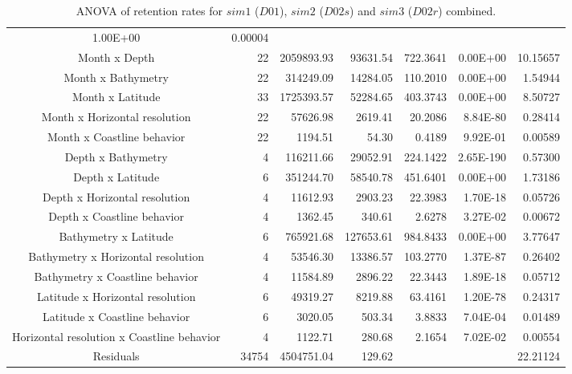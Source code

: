 \begin{table}[H]
\begin{adjustbox}{width=0.9\textwidth}
\begin{tabular}{c|r|r|r|r|r|r}
1.00E+00					& 
0.00004						\\
Month x Depth	& 
22				& 
2059893.93		& 
93631.54		& 
722.3641		& 
0.00E+00		& 
10.15657		\\
Month x Bathymetry	& 
22					& 
314249.09			& 
14284.05			& 
110.2010			& 
0.00E+00			& 
1.54944				\\
Month x Latitude		& 
33						& 
1725393.57				& 
52284.65				& 
403.3743				& 
0.00E+00				& 
8.50727					\\
Month x Horizontal resolution	& 
22								& 
57626.98						& 
2619.41							& 
20.2086							& 
8.84E-80						& 
0.28414							\\
Month x Coastline behavior	& 
22							& 
1194.51						& 
54.30						& 
0.4189						& 
9.92E-01					& 
0.00589						\\
Depth x Bathymetry	& 
4					& 
116211.66			& 
29052.91			& 
224.1422			& 
2.65E-190			& 
0.57300				\\
Depth x Latitude		& 
6						& 
351244.70				& 
58540.78				& 
451.6401				& 
0.00E+00				& 
1.73186					\\
Depth x Horizontal resolution	& 
4								& 
11612.93						& 
2903.23							& 
22.3983							& 
1.70E-18						& 
0.05726							\\
Depth x Coastline behavior	& 
4							& 
1362.45						& 
340.61						& 
2.6278						& 
3.27E-02					& 
0.00672						\\
Bathymetry x Latitude	& 
6						& 
765921.68				& 
127653.61				& 
984.8433				& 
0.00E+00				& 
3.77647					\\
Bathymetry x Horizontal resolution	& 
4									& 
53546.30							& 
13386.57							& 
103.2770							& 
1.37E-87							& 
0.26402								\\
Bathymetry x Coastline behavior			& 
4										& 
11584.89								& 
2896.22									& 
22.3443									& 
1.89E-18								& 
0.05712									\\
Latitude x Horizontal resolution	& 
6									& 
49319.27							& 
8219.88								& 
63.4161								& 
1.20E-78							& 
0.24317								\\
Latitude x Coastline behavior	& 
6								& 
3020.05							& 
503.34							& 
3.8833							& 
7.04E-04						& 
0.01489							\\
Horizontal resolution x Coastline   behavior	&
4												& 
1122.71											&
280.68											& 
2.1654											& 
7.02E-02										& 
0.00554											\\
Residuals	&
34754		& 
4504751.04	& 
129.62		&        
			&
			&
22.21124	\\
\hline
\end{tabular}
\end{adjustbox}
\caption{ANOVA of retention rates for $sim 1$ ($D01$), $sim 2$ ($D02s$) and $sim 3$ ($D02r$) combined.}
\label{TabAnovaSimus}
\end{table}

